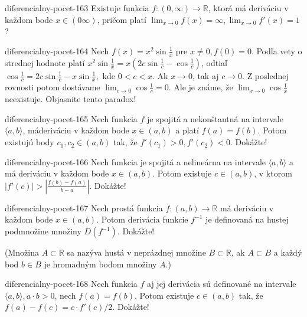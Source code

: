 \begin{defproblem}{diferencialny-pocet-163}
Existuje funkcia $f:(0,\infty)\rightarrow\mathbb{R}$, ktorá má deriváciu v každom bode $x\in (0\infty)$, pričom platí $\lim_{x\rightarrow 0}f(x)=\infty,\lim_{x\rightarrow 0}f'(x)=1$?
\end{defproblem}

\begin{defproblem}{diferencialny-pocet-164}
Nech $f(x)=x^2\sin \frac{1}{x}$ pre $x\neq 0,f(0)=0$. Podľa vety o strednej hodnote platí $x^2\sin \frac{1}{x}=x(2c\sin \frac{1}{c}-\cos \frac{1}{c})$, odtiaľ $\cos \frac{1}{c}=2c\sin \frac{1}{c}-x\sin \frac{1}{x},$ kde $0<c<x$. Ak $x\rightarrow 0$, tak aj $c\rightarrow 0$. Z poslednej rovnosti potom dostávame $\lim_{c\rightarrow 0}\cos \frac{1}{c}=0$. Ale je známe, že $\lim_{x\rightarrow 0}\cos \frac{1}{x}$ neexistuje. Objasnite tento paradox!
\end{defproblem}

\begin{defproblem}{diferencialny-pocet-165}
Nech funkcia $f$ je spojitá a nekonštantná na intervale $\langle a,b \rangle$, máderiváciu v každom bode $x\in (a,b)$ a platí $f(a)=f(b)$. Potom existujú body $c_1,c_2\in (a,b)$ tak, že $f'(c_1)>0,f'(c_2)<0$. Dokážte!
\end{defproblem}

\begin{defproblem}{diferencialny-pocet-166}
Nech funkcia je spojitá a nelineárna na intervale $\langle a,b \rangle$ a má deriváciu v každom bode $x\in (a,b)$. Potom existuje $c\in (a,b)$, v ktorom $|f'(c)|>|\frac{f(b)-f(a)}{b-a}|$. Dokážte!
\end{defproblem}

\begin{defproblem}{diferencialny-pocet-167}
Nech prostá funkcia $f:(a,b)\rightarrow\mathbb{R}$ má deriváciu v každom bode $x\in (a,b)$. Potom derivácia funkcie $f^{-1}$ je definovaná na hustej podmnožine množiny $D(f^{-1})$. Dokážte!

(Množina $A\subset\mathbb{R}$ sa nazýva hustá v neprázdnej množine $B\subset\mathbb{R}$, ak $A\subset B$ a každý bod $b\in B$ je hromadným bodom množiny $A$.)
\end{defproblem}

\begin{defproblem}{diferencialny-pocet-168}
Nech funkcia $f$ aj jej derivácia sú definované na intervale $\langle a,b \rangle,a\cdot b>0$, nech $f(a)=f(b)$. Potom existuje $c\in (a,b)$ tak, že $f(a)-f(c)=c\cdot f'(c)/2$. Dokážte!
\end{defproblem}

